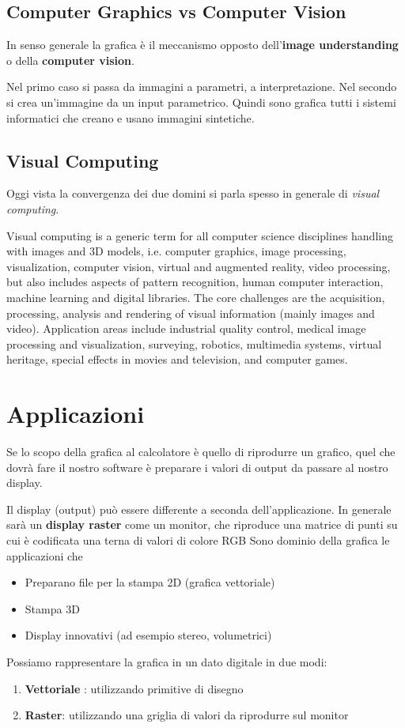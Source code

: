 \documentclass[a4paper, 10pt]{article}
\begin{document}
	\subsection{Computer Graphics vs Computer Vision}
		In senso generale la grafica è il meccanismo opposto dell'\textbf{image understanding} o della \textbf{computer vision}.
		
		\noindent
		Nel primo caso si passa da immagini a parametri, a interpretazione. Nel secondo si crea un'immagine da un input parametrico. Quindi sono grafica tutti i sistemi informatici che creano
		e usano immagini sintetiche.
		
	\subsection{Visual Computing}
		Oggi vista la convergenza dei due domini si parla spesso in
		generale di \textit{ visual computing}.
		
		\noindent
		Visual computing is a generic term for all computer science
		disciplines handling with images and 3D models, i.e. computer
		graphics, image processing, visualization, computer vision,
		virtual and augmented reality, video processing, but also
		includes aspects of pattern recognition, human computer
		interaction, machine learning and digital libraries. The core
		challenges are the acquisition, processing, analysis and
		rendering of visual information (mainly images and video).
		Application areas include industrial quality control, medical
		image processing and visualization, surveying, robotics,
		multimedia systems, virtual heritage, special effects in movies
		and television, and computer games.
		
		\newpage
		
	\section{Applicazioni}
		Se lo scopo della grafica al calcolatore è quello di riprodurre un
		grafico, quel che dovrà fare il nostro software è preparare i
		valori di output da passare al nostro display.
		
		\noindent
		Il display (output) può essere differente a seconda
		dell'applicazione. In generale sarà un \textbf{display raster} come un monitor, che riproduce una matrice di punti su cui è codificata una terna di valori di colore RGB
		Sono dominio della grafica le applicazioni che
		\begin{itemize}
			\item Preparano file per la stampa 2D (grafica vettoriale)
			\item Stampa 3D
			\item Display innovativi (ad esempio stereo, volumetrici)
		\end{itemize}
		Possiamo rappresentare la grafica in un dato digitale in due modi:
		\begin{enumerate}
			\item \textbf{Vettoriale} : utilizzando primitive di disegno
			\item \textbf{Raster}: utilizzando una griglia di valori da riprodurre sul monitor
		\end{enumerate}
		
\end{document}
